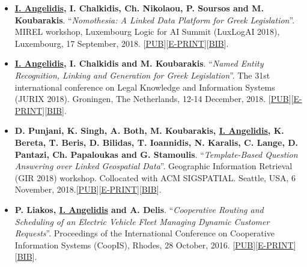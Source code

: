 \documentclass[a4paper,oneside,11pt]{article}
\begin{document}
\begin{itemize}

\item \textbf{\underline{I. Angelidis}, I. Chalkidis, Ch. Nikolaou, P. Soursos and M. Koubarakis}. ``\textit{Nomothesia: A Linked Data Platform for Greek Legislation}''. MIREL workshop, Luxembourg Logic for AI Summit (LuxLogAI 2018), Luxembourg, 17 September, 2018. [\href{https://ora.ox.ac.uk/objects/uuid:b19c1428-49db-402b-8afd-b8cf588e147d}{PUB}][\href{http://cgi.di.uoa.gr/~koubarak/publications/2018/nomothesia-linked-data.pdf}{E-PRINT}][\href{https://ora.ox.ac.uk/objects/uuid:b19c1428-49db-402b-8afd-b8cf588e147d/export_record.bibtex}{BIB}].

\item \textbf{\underline{I. Angelidis}, I. Chalkidis and M. Koubarakis}. ``\textit{Named Entity Recognition, Linking and Generation for Greek Legislation}''. The 31st international conference on Legal Knowledge and Information Systems (JURIX 2018). Groningen, The Netherlands, 12-14 December‚ 2018. [\href{http://ebooks.iospress.nl/publication/50829}{PUB}][\href{http://cgi.di.uoa.gr/~koubarak/publications/2018/jurix2018.pdf}{E-PRINT}][\href{https://dblp.uni-trier.de/rec/bib1/conf/jurix/AngelidisCK18.bib}{BIB}].

\item \textbf{D. Punjani, K. Singh, A. Both, M. Koubarakis, \underline{I. Angelidis}, K. Bereta, T. Beris, D. Bilidas, T. Ioannidis, N. Karalis, C. Lange, D. Pantazi, Ch. Papaloukas and G. Stamoulis}. ``\textit{Template-Based Question Answering over Linked Geospatial Data}''. Geographic Information Retrieval (GIR 2018) workshop. Collocated with ACM SIGSPATIAL. Seattle, USA, 6 November, 2018.[\href{https://dl.acm.org/citation.cfm?doid=3281354.3281362}{PUB}][\href{http://cgi.di.uoa.gr/~koubarak/publications/2018/template-based-GeoQA.pdf}{E-PRINT}][\href{http://dx.doi.org/10.1007/978-3-319-48472-3_7}{BIB}].

\item \textbf{P. Liakos, \underline{I. Angelidis} and A. Delis}. ``\textit{Cooperative Routing and Scheduling of an Electric Vehicle Fleet Managing Dynamic Customer Requests}''. Proceedings of the International Conference on Cooperative Information Systems (CoopIS), Rhodes, 28 October, 2016. [\href{http://dx.doi.org/10.1007/978-3-319-48472-3_7}{PUB}][\href{http://cgi.di.uoa.gr/~ad/Publications/LAD-Coopis16.pdf}{E-PRINT}][\href{https://dblp.uni-trier.de/rec/bib1/conf/otm/LiakosAD16.bib}{BIB}].

\end{itemize}
\end{document}
